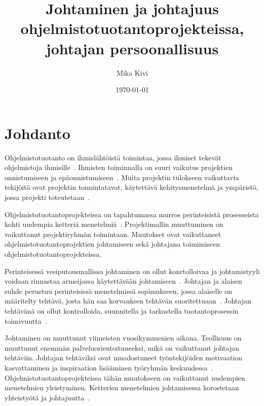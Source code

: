 \documentclass[finnish]{tktltiki2}
\title{Johtaminen ja johtajuus ohjelmistotuotantoprojekteissa, johtajan persoonallisuus}
\author{Mika Kivi}
\date{\today}
\theoremstyle{definition}
\theoremstyle{remark}
\begin{document}

\maketitle        %
\makeabstract     %

\tableofcontents  %
\thispagestyle{empty}
\newpage          %



\setcounter{page}{1}
\section{Johdanto}


Ohjelmistotuotanto on ihmislähtöistä toimintaa, jossa ihmiset tekevät ohjelmistoja ihmisille~\cite{Wang:2010:PPP:1810295.1810302}. Ihmisten toiminnalla on suuri vaikutus projektien onnistumiseen ja epäonnistumiseen~\cite{Wang:2009:PMP:1639950.1640049}. Muita projektin tulokseen vaikuttavia tekijöitä ovat projektin toimintatavat, käytettävä kehitysmenetelmä ja ympäristö, jossa projekti toteutetaan~\cite{McLeod:2011:FAS:1978802.1978803}.

Ohjelmistotuotantoprojekteissa on tapahtumassa murros perinteisistä prosesseista kohti uudempia ketteriä menetelmiä~\cite{Chow2008961}. Projektimallin muuttuminen on vaikuttanut projektiryhmän toimintaan. Muutokset ovat vaikuttaneet ohjelmistotuotantoprojektien johtamiseen sekä johtajana toimimiseen ohjelmistotuotantoprojekteissa.

Perinteisessä vesiputousmallissa johtaminen on ollut konrtolloivaa ja johtamistyyli voidaan rinnastaa armeijassa käytettävään johtamiseen~\cite{Nerur:2005:CMA:1060710.1060712}. Johtajan ja alaisen suhde perustuu perinteisissä menetelmissä sopimukseen, jossa alaiselle on määritelty tehtävä, josta hän saa korvauksen tehtävän suoritettuaan~\cite{thite2000leadership}. Johtajan tehtävänä on ollut kontrolloida, suunnitella ja tarkastella tuotantoprosessin toimivuutta~\cite{palmer2001emotional}.

Johtaminen on muuttunut viimeisten vuosikymmenien aikana. Teollisuus on muuttunut enemmän palveluorientoituneeksi, mikä on vaikuttanut johtajan tehtäviin. Johtajan tehtäviksi ovat muodostuneet työntekijöiden motivaation kasvattaminen ja inspiraation lisääminen työryhmän keskuudessa~\cite{palmer2001emotional}. Ohjelmistotuotantoprojekteissa tähän muutokseen on vaikuttanut uudempien menetelmien yleistyminen. Ketterien menetelmien johtamisessa korostetaan yhteistyötä ja johtajuutta~\cite{Nerur:2005:CMA:1060710.1060712}.
 
\end{document}
